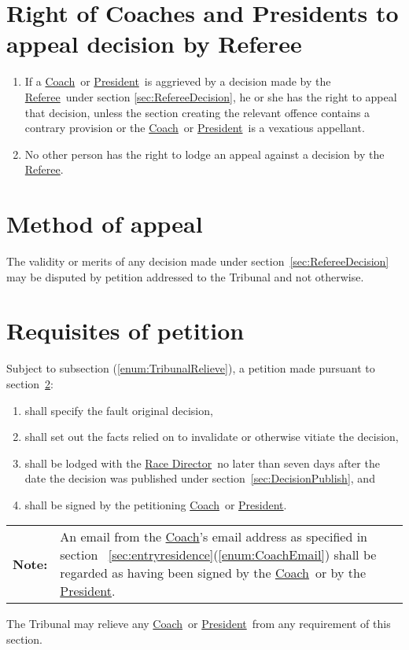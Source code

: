 \documentclass[12pt]{report}
\renewcommand\thesection{\arabic{section}}
\newcommand{\hyplink}[1]{\hyperlink{#1}{{#1}}}
\newcommand\amended{%
}
\newcommand{\Captain}{\hyplink{Coach}}
\newcommand{\Coach}{\hyplink{Coach}}\newcommand{\xCaptain}{Coach}
\newcommand{\note}[1]{{\small%
\begin{tabular}
  {p{0.75cm}p{11.25cm}}
  \textbf{Note:}&#1
\end{tabular}
}}
\newcommand\President{\hyplink{President}}\newcommand\xPresident{President}
\newcommand{\RaceDirector}{\hyplink{Race Director}}
\newcommand{\Referee}{\hyplink{Referee}}
\begin{document}
  \section{Right of \xCaptain es and \xPresident s to appeal decision by Referee}\label{sec:TribunalAppeal}
  \begin{enumerate}
    \item If a \Captain\ or \President\ is aggrieved by a decision made by the \Referee\ under section \ref{sec:RefereeDecision}, he or she has the right to appeal that decision, unless the section creating the relevant offence contains a contrary provision or the \Coach\ or \President\ is a  vexatious appellant.
    \item No other person has the right to lodge an appeal against a decision by the \Referee.
  \end{enumerate}
  \section{Method of appeal}\label{sec:MethodOfAppeal}
  \begin{fenumerate}
    \item The validity or merits of any decision made under section~\ref{sec:RefereeDecision} may be disputed by petition addressed to the Tribunal and not otherwise.
  \end{fenumerate}
  \section{Requisites of petition}
  \begin{fenumerate}
    \item Subject to subsection \thesection(\ref{enum:TribunalRelieve}), a petition made pursuant to section~\ref{sec:MethodOfAppeal}:
    \begin{enumerate}
          \item shall specify the fault original decision,
      \item shall set out the facts relied on to invalidate or otherwise vitiate the decision,
      \item shall be lodged with the \RaceDirector\ no later than seven days after the date the decision was published under section~\ref{sec:DecisionPublish}, and
      \item shall be signed by the petitioning \Coach\ or \President.
    \end{enumerate}
    \note{An email from the \Coach's email address as specified in section~ \ref{sec:entryresidence}(\ref{enum:CoachEmail}) shall be regarded as having been signed by the \Coach\ or by the \President.}
    \item The Tribunal may relieve any \Coach\ or \President\ from any requirement of this section.\label{enum:TribunalRelieve}
  \end{fenumerate}
\end{document}
